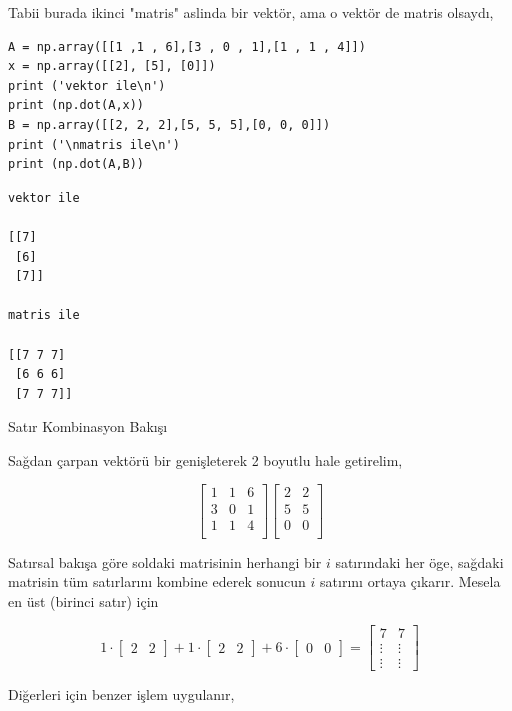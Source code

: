 \documentclass[12pt,fleqn]{article}\usepackage{../../common}
\begin{document}
Tabii burada ikinci "matris" aslinda bir vektör, ama o vektör de matris
olsaydı,

\begin{verbatim}
A = np.array([[1 ,1 , 6],[3 , 0 , 1],[1 , 1 , 4]])
x = np.array([[2], [5], [0]])
print ('vektor ile\n')
print (np.dot(A,x))
B = np.array([[2, 2, 2],[5, 5, 5],[0, 0, 0]])
print ('\nmatris ile\n')
print (np.dot(A,B))
\end{verbatim}

\begin{verbatim}
vektor ile

[[7]
 [6]
 [7]]

matris ile

[[7 7 7]
 [6 6 6]
 [7 7 7]]
\end{verbatim}

Satır Kombinasyon Bakışı

Sağdan çarpan vektörü bir genişleterek 2 boyutlu hale getirelim, 

$$
\left[\begin{array}{ccc}
1 & 1 & 6 \\
3 & 0 & 1 \\
1 & 1 & 4 \\
\end{array}\right]
\left[\begin{array}{ccc}
2 & 2  \\
5 & 5  \\
0 & 0  \\
\end{array}\right]
$$

Satırsal bakışa göre soldaki matrisinin herhangi bir $i$ satırındaki her
öge, sağdaki matrisin tüm satırlarını kombine ederek sonucun $i$ satırını
ortaya çıkarır. Mesela en üst (birinci satır) için

$$ 
1 \cdot
\left[\begin{array}{cc}
2 & 2
\end{array}\right] +
1 \cdot
\left[\begin{array}{cc}
2 & 2
\end{array}\right] + 
6 \cdot
\left[\begin{array}{cc}
0 & 0
\end{array}\right] 
=
\left[\begin{array}{cc}
7 & 7 \\
\vdots & \vdots \\
\vdots & \vdots
\end{array}\right] 
$$

Diğerleri için benzer işlem uygulanır, 
\end{document}
